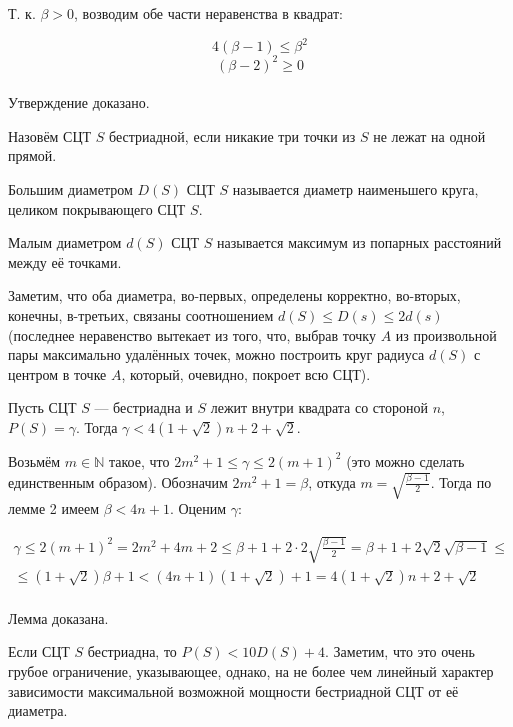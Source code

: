 \dokvo
	Т. к. $\beta >0$, возводим обе части неравенства в квадрат:

	$$4 (\beta - 1) \leq \beta^2$$
	$$ (\beta-2)^2 \geq 0$$
\\ Утверждение доказано.

\begin{opr}
	Назовём СЦТ $S$ бестриадной, если никакие три точки из $S$ не лежат на одной прямой.
\end{opr}

\begin{opr}
	Большим диаметром $D(S)$ СЦТ $S$ называется диаметр наименьшего круга, целиком покрывающего СЦТ $S$.
\end{opr}

\begin{opr}
	Малым диаметром $d(S)$ СЦТ $S$ называется максимум из попарных расстояний между её точками.
\end{opr}

Заметим, что оба диаметра, во-первых, определены корректно, во-вторых, конечны, в-третьих, связаны соотношением $d(S)\leq D(s) \leq 2d(s)$ (последнее неравенство вытекает из того, что, выбрав точку $A$ из произвольной пары максимально удалённых точек, можно построить круг радиуса $d(S)$ с центром в точке $A$, который, очевидно, покроет всю СЦТ).


\begin{lemma}
	Пусть СЦТ $S$ --- бестриадна и $S$ лежит внутри квадрата со стороной $n$, $P(S)=\gamma$.
	Тогда $\gamma<4(1+\sqrt{2})n+2+\sqrt{2}$.
\end{lemma}

\dokvo
	Возьмём $m \in \mathbb{N}$ такое, что $2m^2+1 \le \gamma \le 2(m+1)^2$ (это можно сделать единственным образом).
	Обозначим $2m^2+1=\beta$, откуда $m=\sqrt{\frac{\beta-1}{2}}$. Тогда по лемме 2 имеем $ \beta < 4n +1$. Оценим $\gamma$:

	\begin{multline}
		\gamma \le 2(m+1)^2 = 2m^2+4m +2 \leq
		\beta + 1 + 2 \cdot 2 \sqrt{\frac{\beta-1}{2}} =
		\beta + 1 +2\sqrt{2}\sqrt{\beta-1} \leq
		\\ \leq
		(1+\sqrt{2})\beta+1 <
		(4n+1)(1+\sqrt{2})+1 =
		4(1+\sqrt{2})n+2+\sqrt{2}
	\end{multline}
\\ Лемма доказана.

\begin{sledstvie}
	Если СЦТ $S$ бестриадна, то
	$P(S) < 10 D(S)+4$.
	Заметим, что это очень грубое ограничение, указывающее, однако,
	на не более чем линейный характер зависимости максимальной возможной мощности  бестриадной СЦТ от её диаметра.
\end{sledstvie}

